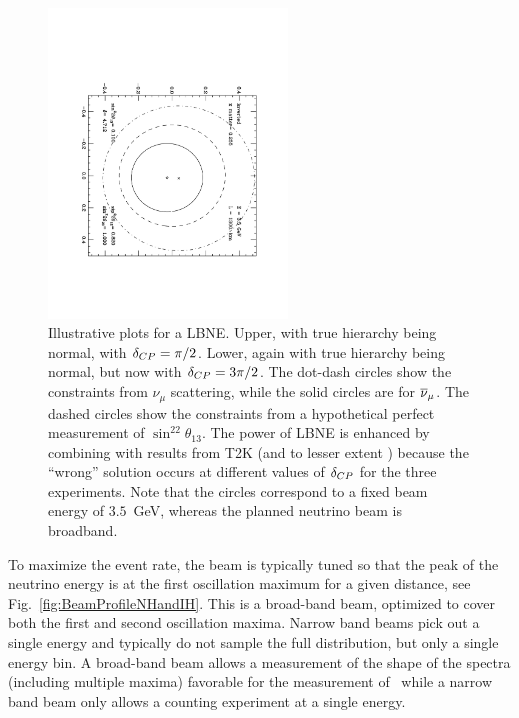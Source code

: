 \begin{figure}[hbp]
\begin{center}
\includegraphics[width=2.5in,angle=90]{RNC/cpv_lbne_threepibytwo_inv.pdf}
\caption{Illustrative plots for a LBNE.  Upper, with true hierarchy
being normal, 
with $\delta_{CP}=\pi/2$.  Lower, again with true hierarchy being normal,
but now with $\delta_{CP}=3\pi/2$. The dot-dash circles show the
constraints from $\nu_\mu$ scattering, while the solid circles are for
$\overline\nu_\mu$.  The dashed circles show the constraints from a
hypothetical perfect measurement of $\sin^22\theta_{13}$.  The power
of LBNE is enhanced by combining with results from T2K (and to lesser
extent \NOvA) because the ``wrong'' solution occurs at different values
of $\delta_{CP}$ for the three experiments. Note that the circles
correspond to a fixed beam energy of $3.5$~GeV, whereas the planned
neutrino beam is broadband. \label{fig_lbne}} 
\end{center}\end{figure}

To maximize the event rate, the beam is typically tuned so that the
peak of the neutrino energy is at the first oscillation maximum for a
given distance, see Fig.~\ref{fig:BeamProfileNHandIH}. This is a
broad-band beam, optimized to cover both the first and second oscillation
maxima. Narrow band beams pick out a single energy and typically do
not sample the full distribution, but only a single  energy bin.  A
broad-band beam allows a measurement of the shape of the spectra
(including multiple maxima) favorable for the measurement
of \deltacp\, while a narrow band beam  only allows a counting
experiment at a single energy.  



